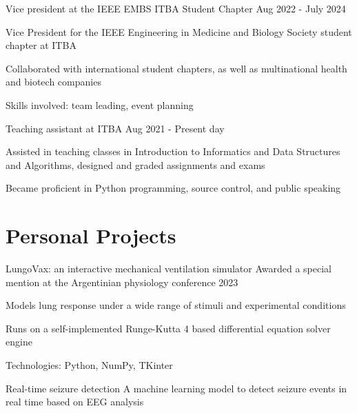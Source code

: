 \documentclass{resume}
\begin{document}
    \resumeSubheading
    {Vice president at the IEEE EMBS ITBA Student Chapter}{}
    {}{Aug 2022 - July 2024}
    \vspace{-5mm}
    \resumeItemListStart
    \item{Vice President for the IEEE Engineering in Medicine and Biology Society student chapter at ITBA}
    \item{Collaborated with international student chapters,
        as well as multinational health and biotech companies}
    \item {Skills involved: team leading, event planning}
    \resumeItemListEnd


    \resumeSubheading
    {Teaching assistant at ITBA}{}
    {}{Aug 2021 - Present day}
    \vspace{-5mm}
    \resumeItemListStart
    \item
    {Assisted in teaching classes in Introduction to Informatics and Data Structures and Algorithms,
        designed and graded assignments and exams}
    \item {Became proficient in Python programming, source control, and public speaking}
    \resumeItemListEnd
    \resumeSubHeadingListEnd

    \vspace{-5mm}


    \section{\textbf{Personal Projects}} \label{sec:projects}
    \resumeSubHeadingListStart
    \resumeProject
    {LungoVax: an interactive mechanical ventilation simulator} %
    {Awarded a special mention at the Argentinian physiology conference 2023} %
    {} %

    \resumeItemListStart
    \item {Models lung response under a wide range of stimuli and experimental conditions}
    \item {Runs on a self-implemented Runge-Kutta 4 based differential equation solver engine}
    \item {Technologies: Python, NumPy, TKinter}
    \resumeItemListEnd

    \resumeProject
    {Real-time seizure detection} %
    {A machine learning model to detect seizure events in real time based on EEG analysis} %
    {} %
\end{document}
